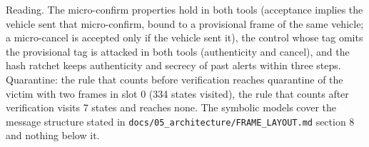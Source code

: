 Reading. The micro-confirm properties hold in both tools (acceptance implies the vehicle sent that micro-confirm, bound to a provisional frame of the same vehicle; a micro-cancel is accepted only if the vehicle sent it), the control whose tag omits the provisional tag is attacked in both tools (authenticity and cancel), and the hash ratchet keeps authenticity and secrecy of past alerts within three steps. Quarantine: the rule that counts before verification reaches quarantine of the victim with two frames in slot 0 (334 states visited), the rule that counts after verification visits 7 states and reaches none. The symbolic models cover the message structure stated in \texttt{docs/05\_architecture/FRAME\_LAYOUT.md} section 8 and nothing below it.

